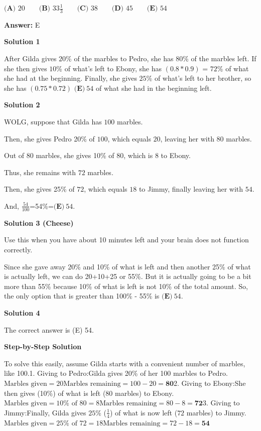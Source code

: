 \begin{enumerate}
 $\textbf{(A) }20\qquad\textbf{(B) }33\frac{1}{3}\qquad\textbf{(C) }38\qquad\textbf{(D) }45\qquad\textbf{(E) }54$

 \textbf{Answer: }E



\textbf{Solution 1}

After Gilda gives $20$\% of the marbles to Pedro, she has $80$\% of the marbles left. If she then gives $10$\% of what's left to Ebony, she has $(0.8*0.9)$ = $72$\% of what she had at the beginning. Finally, she gives $25$\% of what's left to her brother, so she has $(0.75*0.72)$ $\boxed{\textbf{(E)}\ 54}$ of what she had in the beginning left.

 



\textbf{Solution 2}

WOLG, suppose that Gilda has $100$ marbles. 

 Then, she gives Pedro 20\% of $100$, which equals $20$, leaving her with $80$ marbles.

 Out of $80$ marbles, she gives 10\% of $80$, which is 8 to Ebony. 

 Thus, she remains with $72$ marbles. 

 Then, she gives 25\% of $72$, which equals $18$ to Jimmy, finally leaving her with $54$. 

 And, $\frac{54}{100}$=54\%=$\boxed{\textbf{(E)}\ 54}$.

 



\textbf{Solution 3 (Cheese)}

Use this when you have about 10 minutes left and your brain does not function correctly.

 Since she gave away 20\% and 10\% of what is left and then another 25\% of what is actually left, we can do 20+10+25 or 55\%. But it is actually going to be a bit more than 55\% because 10\% of what is left is not 10\% of the total amount. So, the only option that is greater than 100\% - 55\% is $\boxed{\textbf{(E)}\ 54}$.

 



\textbf{Solution 4}

The correct answer is (E) 54.

 \textbf{Step-by-Step Solution}

 To solve this easily, assume Gilda starts with a convenient number of marbles, like 100.1. Giving to Pedro:Gilda gives 20\% of her 100 marbles to Pedro.\(\text{Marbles given}=20\)\(\text{Marbles remaining}=100-20=\mathbf{80}\)2. Giving to Ebony:She then gives (10\%) of what is left (\(80\) marbles) to Ebony.\(\text{Marbles given}=10\%\text{ of }80=8\)\(\text{Marbles remaining}=80-8=\mathbf{72}\)3. Giving to Jimmy:Finally, Gilda gives \(25\%\) (\(\frac{1}{4}\)) of what is now left (\(72\) marbles) to Jimmy.\(\text{Marbles given}=25\%\text{ of }72=18\)\(\text{Marbles remaining}=72-18=\mathbf{54}\)


\end{enumerate}

